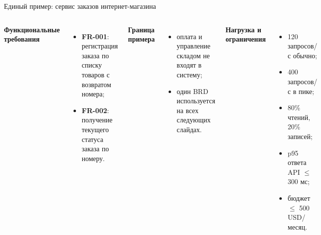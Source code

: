 \documentclass[aspectratio=169,10pt]{beamer}
\begin{document}
\begin{frame}{Единый пример: сервис заказов интернет-магазина}
  \begin{columns}[T,onlytextwidth]
      \textbf{Функциональные требования}
      \begin{itemize}
        \item \textbf{FR-001}: регистрация заказа по списку товаров с возвратом номера;
        \item \textbf{FR-002}: получение текущего статуса заказа по номеру.
      \end{itemize}
      \vspace{0.20cm}
      \textbf{Граница примера}
      \begin{itemize}
        \item оплата и управление складом не входят в систему;
        \item один BRD используется на всех следующих слайдах.
      \end{itemize}
      \textbf{Нагрузка и ограничения}
      \begin{itemize}
        \item 120 запросов/с обычно;
        \item 400 запросов/с в пике;
        \item 80\% чтений, 20\% записей;
        \item p95 ответа API $\leq$ 300 мс;
        \item бюджет $\leq$ 500 USD/месяц.
      \end{itemize}
  \end{columns}
\end{frame}
\end{document}
